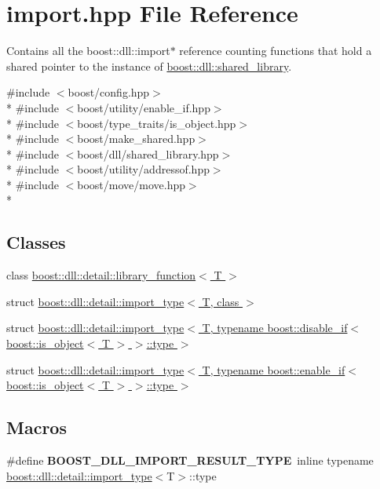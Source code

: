 \hypertarget{a00570}{}\section{import.\+hpp File Reference}
\label{a00570}


Contains all the boost\+::dll\+::import$\ast$ reference counting functions that hold a shared pointer to the instance of \hyperlink{a00271}{boost\+::dll\+::shared\+\_\+library}.  


{\ttfamily \#include $<$boost/config.\+hpp$>$}\\*
{\ttfamily \#include $<$boost/utility/enable\+\_\+if.\+hpp$>$}\\*
{\ttfamily \#include $<$boost/type\+\_\+traits/is\+\_\+object.\+hpp$>$}\\*
{\ttfamily \#include $<$boost/make\+\_\+shared.\+hpp$>$}\\*
{\ttfamily \#include $<$boost/dll/shared\+\_\+library.\+hpp$>$}\\*
{\ttfamily \#include $<$boost/utility/addressof.\+hpp$>$}\\*
{\ttfamily \#include $<$boost/move/move.\+hpp$>$}\\*
\subsection*{Classes}
\begin{DoxyCompactItemize}
\item 
class \hyperlink{a00191}{boost\+::dll\+::detail\+::library\+\_\+function$<$ T $>$}
\item 
struct \hyperlink{a00152}{boost\+::dll\+::detail\+::import\+\_\+type$<$ T, class $>$}
\item 
struct \hyperlink{a00153}{boost\+::dll\+::detail\+::import\+\_\+type$<$ T, typename boost\+::disable\+\_\+if$<$ boost\+::is\+\_\+object$<$ T $>$ $>$\+::type $>$}
\item 
struct \hyperlink{a00154}{boost\+::dll\+::detail\+::import\+\_\+type$<$ T, typename boost\+::enable\+\_\+if$<$ boost\+::is\+\_\+object$<$ T $>$ $>$\+::type $>$}
\end{DoxyCompactItemize}
\subsection*{Macros}
\begin{DoxyCompactItemize}
\item 
\#define {\bfseries B\+O\+O\+S\+T\+\_\+\+D\+L\+L\+\_\+\+I\+M\+P\+O\+R\+T\+\_\+\+R\+E\+S\+U\+L\+T\+\_\+\+T\+Y\+PE}~inline typename \hyperlink{a00152}{boost\+::dll\+::detail\+::import\+\_\+type}$<$T$>$\+::type\hypertarget{a00570_a970b9f65fd3a27056507924072cfa150}{}\label{a00570_a970b9f65fd3a27056507924072cfa150}

\end{DoxyCompactItemize}
